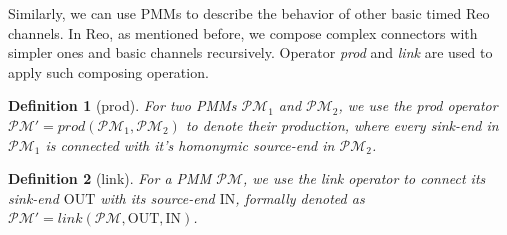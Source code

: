 \documentclass[conference, a4paper]{IEEEtran}
\newtheorem{definition}{Definition}
\newcommand{\OUT}[0]{\mbox{OUT}}
\newcommand{\IN}[0]{\mbox{IN}}
\begin{document}
Similarly, we can use PMMs to describe the behavior of other basic timed Reo
channels. In Reo, as mentioned before, we compose complex connectors with simpler ones and basic
channels recursively. Operator \emph{prod} and \emph{link} are used to apply such composing
operation. 

\begin{definition}[prod]
  For two PMMs $\mathcal{PM}_1$ and $\mathcal{PM}_2$, we use the \emph{prod} operator
  $\mathcal{PM'} = prod(\mathcal{PM}_1,\mathcal{PM}_2)$ to denote their production, where every
  sink-end in $\mathcal{PM}_1$ is connected with it's homonymic source-end in $\mathcal{PM}_2$.
\end{definition}

\begin{definition}[link]
  For a PMM $\mathcal{PM}$, we use the \emph{link} operator to connect its sink-end $\OUT$ with its
  source-end $\IN$, formally denoted as $\mathcal{PM}' = link(\mathcal{PM}, \OUT, \IN)$.
\end{definition}
\end{document}
